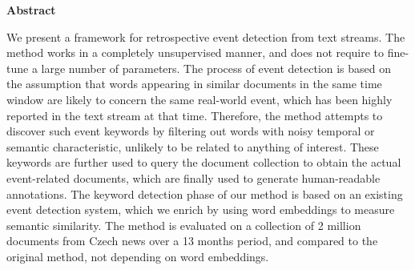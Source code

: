 \thispagestyle{plain}

\begin{center}
	\Large
	\textbf{Abstract}
\end{center}

We present a framework for retrospective event detection from text streams. The method works in a completely unsupervised manner, and does not require to fine-tune a large number of parameters. The process of event detection is based on the assumption that words appearing in similar documents in the same time window are likely to concern the same real-world event, which has been highly reported in the text stream at that time. Therefore, the method attempts to discover such event keywords by filtering out words with noisy temporal or semantic characteristic, unlikely to be related to anything of interest. These keywords are further used to query the document collection to obtain the actual event-related documents, which are finally used to generate human-readable annotations. The keyword detection phase of our method is based on an existing event detection system, which we enrich by using word embeddings to measure semantic similarity. The method is evaluated on a collection of 2 million documents from Czech news over a 13 months period, and compared to the original method, not depending on word embeddings.